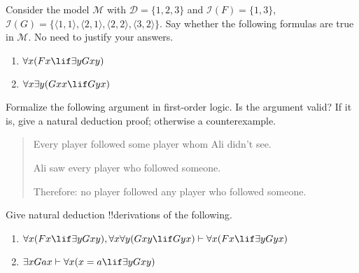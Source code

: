 \documentclass[../../../include/open-logic-section]{subfiles}
\begin{document}


\begin{prob}

    Consider the model $\mathcal{M}$ with $\mathcal{D}=\{1,2,3\}$ and
    $\mathcal{I}(F)=\{1,3\}$, $\mathcal{I}(G)=\{\langle1,1\rangle,\langle2,1\rangle,\langle2,2\rangle,\langle3,2\rangle\}$.
    Say whether the following formulas are true in $\mathcal{M}$. No
    need to justify your answers.
    \begin{enumerate}
    \item $\forall x(Fx\lif\exists yGxy)$
    \item $\forall x\exists y(Gxx\lif Gyx)$
    \end{enumerate}

\end{prob}

\begin{prob}

    Formalize the following argument in first-order logic. Is the argument
    valid? If it is, give a natural deduction proof; otherwise a counterexample.
    \begin{quote}
    Every player followed some player whom Ali didn't see. 
    
    Ali saw every player who followed someone.
    
    Therefore: no player followed any player who followed someone.
    \end{quote}
\end{prob}

\begin{prob}
    Give natural deduction !!{derivation}s of the following.
    \begin{enumerate}
    \item $\forall x(Fx\lif\exists yGxy),\forall x\forall y(Gxy\lif Gyx)\vdash\forall x(Fx\lif\exists yGyx)$
    \item $\exists xGax\vdash\forall x(x=a\lif\exists yGxy)$
    \end{enumerate}
\end{prob}
\end{document}
